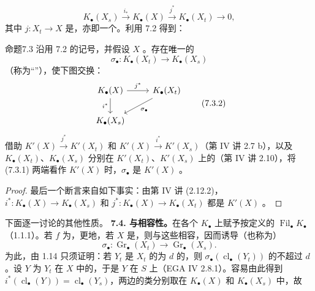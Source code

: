 \[K_\bullet(X_s)\xrightarrow{i_*}K_\bullet(X)\xrightarrow{j^*}K_\bullet(X_t)\longrightarrow0,\]
其中 $j:X_t\to X$ 是，亦即一个。利用 7.2 得到：
\begin{SGAresult}{命题}{7.3}
沿用 7.2 的记号，并假设 $X$ 。存在唯一的
\[\sigma_\bullet:K_\bullet(X_t)\longrightarrow K_\bullet(X_s)\tag{7.3.1}\]
（称为“”），使下图交换：
\[\begin{tikzcd}K_\bullet(X)\arrow[r,"j^*"]\arrow[d,"i^*"']&K_\bullet(X_t)\arrow[dl,"\sigma_\bullet"]\\K_\bullet(X_s)&\end{tikzcd}\tag{7.3.2}\]
借助 $K'(X)\xrightarrow{j^*}K'(X_t)$ 和 $K'(X)\xrightarrow{i^*}K'(X_s)$（第 IV 讲 2.7 b），以及 $K_\bullet(X_t)$、$K_\bullet(X_s)$ 分别在 $K'(X_t)$、$K'(X_s)$ 上的（第 IV 讲 2.10），将 (7.3.1) 两端看作 $K'(X)$ 时，$\sigma_\bullet$ 是 $K'(X)$ 。
\end{SGAresult}
\begin{proof}
最后一个断言来自如下事实：由第 IV 讲 (2.12.2)，$i^*:K_\bullet(X)\to K_\bullet(X_s)$ 和 $j^*:K_\bullet(X)\to K_\bullet(X_t)$ 都是 $K'(X)$ 。
\end{proof}
下面逐一讨论的其他性质。
\textbf{7.4. 与相容性。}在各个 $K_\bullet$ 上赋予按定义的 $\operatorname{Fil}_\bullet K_\bullet$（1.1.1）。若 $f$ 为，更地，若 $X$ 是，则与这些相容，因而诱导（也称为）
\[\sigma_\bullet:\operatorname{Gr}_\bullet(X_t)\longrightarrow\operatorname{Gr}_\bullet(X_s).\tag{7.4.1}\]
为此，由 1.14 只须证明：若 $Y_t$ 是 $X_t$ 的为 $d$ 的，则 $\sigma_\bullet(\operatorname{cl}_\bullet(Y_t))$ 的不超过 $d$。设 $Y$ 为 $Y_t$ 在 $X$ 中的，于是 $Y$ 在 $S$ 上（EGA IV 2.8.1）。容易由此得到 $i^*(\operatorname{cl}_\bullet(Y))=\operatorname{cl}_\bullet(Y_s)$，两边的类分别取在 $K_\bullet(X)$ 和 $K_\bullet(X_s)$ 中，故
